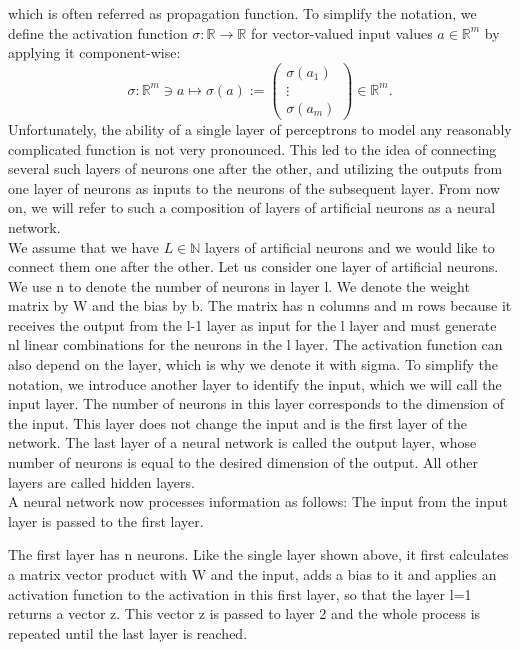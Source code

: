 which is often referred as propagation function. To simplify the notation, we define the activation function $\sigma \colon \mathbb{R} \to \mathbb{R}$ for vector-valued input values $a \in \mathbb{R}^m$ by applying it component-wise: 
\begin{equation*}
    \sigma \colon \mathbb{R}^{m} \ni a \mapsto \sigma(a):= \left(
        \begin{array}
            {c} \sigma \left( a_{1} \right) \\
            \vdots \\
            \sigma\left(a_{m}\right)
        \end{array}
        \right) \in \mathbb{R}^{m}.
\end{equation*}
Unfortunately, the ability of a single layer of perceptrons to model any reasonably complicated function is not very pronounced. This led to the idea of connecting several such layers of neurons one after the other, and utilizing the outputs from one layer of neurons as inputs to the neurons of the subsequent layer. From now on, we will refer to such a composition of layers of artificial neurons as a neural network. \\
We assume that we have $L \in \mathbb{N}$ layers of artificial neurons and we would like to connect them one after the other. Let us consider one layer of artificial neurons. We use n to denote the number of neurons in layer l. We denote the weight matrix by W and the bias by b. The matrix has n columns and m rows because it receives the output from the l-1 layer as input for the l layer and must generate nl linear combinations for the neurons in the l layer. The activation function can also depend on the layer, which is why we denote it with sigma. To simplify the notation, we introduce another layer to identify the input, which we will call the input layer. The number of neurons in this layer corresponds to the dimension of the input. This layer does not change the input and is the first layer of the network. The last layer of a neural network is called the output layer, whose number of neurons is equal to the desired dimension of the output. All other layers are called hidden layers. \\
A neural network now processes information as follows: The input from the input layer is passed to the first layer. 

The first layer has n neurons. Like the single layer shown above, it first calculates a matrix vector product with W and the input, adds a bias to it and applies an activation function to the activation in this first layer, so that the layer l=1 returns a vector z. This vector z is passed to layer 2 and the whole process is repeated until the last layer is reached.  


